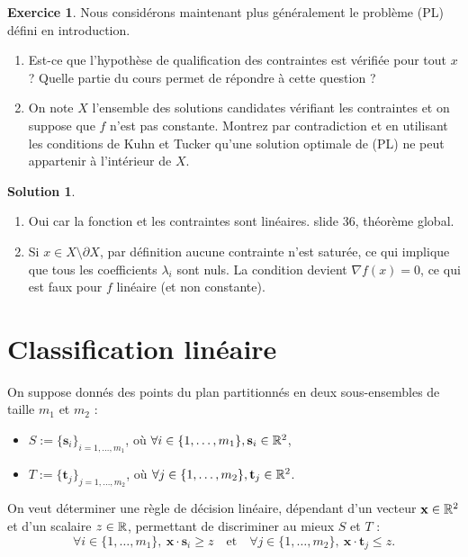 \documentclass[a4paper,francais]{article}
\newcommand{\R}{{\ensuremath\mathbb{R}}}
\theoremstyle{definition}
\newtheorem{exercice}{Exercice}[section]
\newtheorem*{solution}{Solution}
\begin{document}
\begin{exercice}
  Nous considérons maintenant plus généralement le problème (PL) défini
  en introduction. 
  \begin{enumerate}
  \item Est-ce que l'hypothèse de qualification des contraintes est vérifiée
    pour tout $x$ ? Quelle partie du cours permet de répondre à cette question ?
  \item On note $X$ l'ensemble des solutions candidates vérifiant
    les contraintes et on suppose que $f$ n'est pas constante. Montrez par contradiction et
    en utilisant les conditions de Kuhn et Tucker qu'une solution optimale de (PL)
    ne peut appartenir à l'intérieur de $X$.
  \end{enumerate}
\end{exercice}

\begin{solution}
  \begin{enumerate}
  \item Oui car la fonction et les contraintes sont linéaires. slide 36, théorème global. 
  \item Si $x \in X \setminus \partial X$, par définition aucune contrainte n'est saturée,
  ce qui implique que tous les coefficients $\lambda_i$ sont nuls. La condition
  devient ${\nabla f}(x) = 0$, ce qui est faux pour $f$ linéaire (et non constante).
  \end{enumerate}
\end{solution}

\section{Classification linéaire}
\label{sec:classif}

\let\vec\mathbf

On suppose donnés des points du plan partitionnés en deux sous-ensembles de taille $m_1$ et $m_2$ :
\begin{itemize}
\item $S := \{ \vec{s}_i \}_{i=1,\dots,m_1}$, où $\forall i \in \{1,\dots,m_1\}, \vec{s}_i \in \R^2$, 
\item $T := \{ \vec{t}_j \}_{j=1,\dots,m_2}$, où $\forall j \in \{1,\dots,m_2\}, \vec{t}_j \in \R^2$.
\end{itemize}

On veut déterminer une règle de décision linéaire, dépendant d'un vecteur $\vec{x} \in \R^2$
et d'un scalaire $z \in \R$, permettant de discriminer au mieux $S$ et $T$ :
\begin{equation}
  \label{eq:regle}
\forall i \in \{1,\dots,m_1\}, \ \vec{x} \cdot \vec{s}_i \geq z
\quad \text{et} \quad
\forall j \in \{1, \dots, m_2\}, \ \vec{x} \cdot \vec{t}_j \leq z.
\end{equation}
\end{document}
